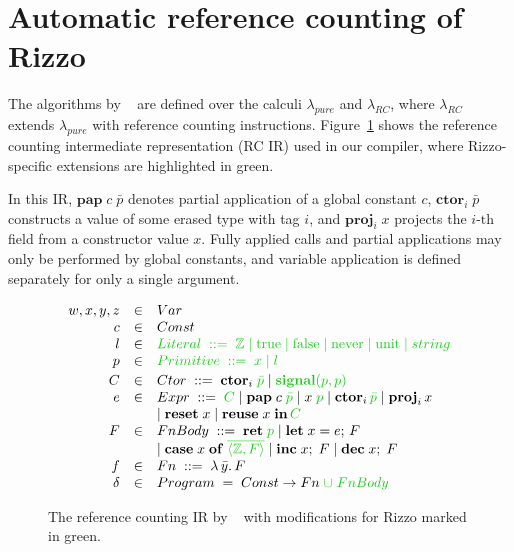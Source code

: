 \section{Automatic reference counting of Rizzo}\label{section:refcount}

The algorithms by \citeauthor{ullrich_counting_2021}~\cite{ullrich_counting_2021} are defined over the calculi $\lambda_{pure}$ and $\lambda_{RC}$, where $\lambda_{RC}$ extends $\lambda_{pure}$ with reference counting instructions.
Figure~\ref{figure:refcount_IR} shows the reference counting intermediate representation (RC IR) used in our compiler, where Rizzo-specific extensions are highlighted in green.

In this IR, $\mathbf{pap}\; c \; \bar p$ denotes partial application of a global constant $c$, $\mathbf{ctor}_i \; \bar p$ constructs a value of some erased type with tag $i$, and $\mathbf{proj}_i \; x$ projects the $i\text{-th}$ field from a constructor value $x$. Fully applied calls and partial applications may only be performed by global constants, and variable application is defined separately for only a single argument.

\begin{figure}[ht]
  \centering
  \small
  \[
  \begin{array}{rcl}
  w,x,y,z &\in& Var\\
  c &\in& Const\\
  l &\in& \textcolor{greenadditions}{Literal \;::=\; \mathbb{Z} \mid \text{true} \mid \text{false} \mid \text{never} \mid \text{unit} \mid string}\\
  p &\in& \textcolor{greenadditions}{Primitive \;::=\; x \mid l}\\[2pt]
  C &\in& 
    Ctor \; ::= \; 
      \mathbf{ctor}_i \; \textcolor{greenadditions}{\bar p} \mid 
      \textcolor{greenadditions}{\mathbf{signal}(p,p)} \\
  e &\in&
  \begin{array}[t]{@{}l@{}}
  Expr \;::=\; \textcolor{greenadditions}{C}
  \mid \mathbf{pap}\; c\; \textcolor{greenadditions}{\bar p}
  \mid x \; \textcolor{greenadditions}{p}
  \mid \mathbf{ctor}_i\,\textcolor{greenadditions}{\bar p}
  \mid \mathbf{proj}_i\, x \\
  \mid \mathbf{reset} \; x 
  \mid \mathbf{reuse} \; x \;\mathbf{in}\, \textcolor{greenadditions}{C}
  \end{array}
  \\[2pt]
  F &\in& FnBody \;::=\; 
  	\mathbf{ret}\;\textcolor{greenadditions}{p}
  	\mid \mathbf{let}\;x=e;\,F\\
  	&& \mid \mathbf{case}\;x\;\mathbf{of}\;\textcolor{greenadditions}{\overline{\langle \mathbb{Z},F\rangle}}
	\mid \mathbf{inc} \; x;\;F
	\mid \mathbf{dec} \; x;\;F
	\\
  f &\in& Fn \;::=\; \lambda\,\bar y.\,F\\
  \delta &\in& Program \;=\; Const \to Fn \; \textcolor{greenadditions}{\cup \; FnBody}
  \end{array}
  \]
  \caption{The reference counting IR by \citeauthor{ullrich_counting_2021}~\cite{ullrich_counting_2021} with modifications for Rizzo marked in green.}\label{figure:refcount_IR}
\end{figure}

